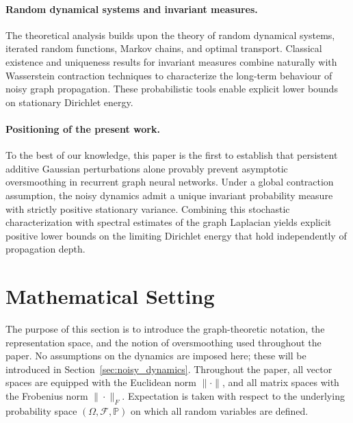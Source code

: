 \documentclass{article}
\begin{document}
\paragraph{Random dynamical systems and invariant measures.}

The theoretical analysis builds upon the theory of random dynamical systems,
iterated random functions,
Markov chains,
and optimal transport.
Classical existence and uniqueness results for invariant measures
\cite{diaconis1999iterated,arnold1998,meyn2009}
combine naturally with Wasserstein contraction techniques
\cite{villani2003,villani2009,hairer2011}
to characterize the long-term behaviour of noisy graph propagation.
These probabilistic tools enable explicit lower bounds on stationary
Dirichlet energy.

\paragraph{Positioning of the present work.}

To the best of our knowledge,
this paper is the first to establish that persistent additive Gaussian
perturbations alone provably prevent asymptotic oversmoothing in recurrent
graph neural networks.
Under a global contraction assumption,
the noisy dynamics admit a unique invariant probability measure with
strictly positive stationary variance.
Combining this stochastic characterization with spectral estimates of the
graph Laplacian yields explicit positive lower bounds on the limiting
Dirichlet energy that hold independently of propagation depth.



\section{Mathematical Setting}
\label{sec:mathematical_setting}

The purpose of this section is to introduce the graph-theoretic notation,
the representation space, and the notion of oversmoothing used throughout
the paper.  No assumptions on the dynamics are imposed here; these will be
introduced in Section~\ref{sec:noisy_dynamics}.
Throughout the paper, all vector spaces are equipped with the Euclidean norm
$\|\cdot\|$, and all matrix spaces with the Frobenius norm
$\|\cdot\|_{F}$.
Expectation is taken with respect to the underlying probability space
$(\Omega,\mathcal{F},\mathbb{P})$ on which all random variables are
defined.
\end{document}
